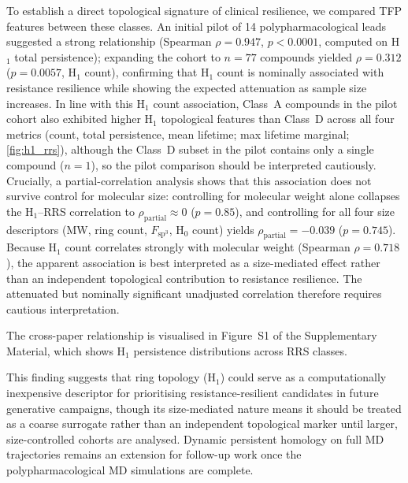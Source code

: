 \documentclass[11pt,a4paper]{article}
\begin{document}
To establish a direct topological signature of clinical resilience, we compared TFP features between these classes. An initial pilot of 14 polypharmacological leads suggested a strong relationship (Spearman $\rho = \num{0.947}$, $p < \num{0.0001}$, computed on H$_1$ total persistence); expanding the cohort to $n = \num{77}$ compounds yielded $\rho = \num{0.312}$ ($p = \num{0.0057}$, H$_1$ count), confirming that H$_1$ count is nominally associated with resistance resilience while showing the expected attenuation as sample size increases. In line with this H$_1$ count association, Class~A compounds in the pilot cohort also exhibited higher H$_1$ topological features than Class~D across all four metrics (count, total persistence, mean lifetime; max lifetime marginal; \cref{fig:h1_rrs}), although the Class~D subset in the pilot contains only a single compound ($n = 1$), so the pilot comparison should be interpreted cautiously. Crucially, a partial-correlation analysis shows that this association does not survive control for molecular size: controlling for molecular weight alone collapses the H$_1$--RRS correlation to $\rho_{\text{partial}} \approx 0$ ($p = \num{0.85}$), and controlling for all four size descriptors (MW, ring count, $F_{\mathrm{sp}^3}$, H$_0$ count) yields $\rho_{\text{partial}} = -\num{0.039}$ ($p = \num{0.745}$). Because H$_1$ count correlates strongly with molecular weight (Spearman $\rho = \num{0.718}$), the apparent association is best interpreted as a size-mediated effect rather than an independent topological contribution to resistance resilience. The attenuated but nominally significant unadjusted correlation therefore requires cautious interpretation.

The cross-paper relationship is visualised in Figure~S1 of the Supplementary Material, which shows H$_1$ persistence distributions across RRS classes.

This finding suggests that ring topology (H$_1$) could serve as a computationally inexpensive descriptor for prioritising resistance-resilient candidates in future generative campaigns, though its size-mediated nature means it should be treated as a coarse surrogate rather than an independent topological marker until larger, size-controlled cohorts are analysed. Dynamic persistent homology on full MD trajectories remains an extension for follow-up work once the polypharmacological MD simulations are complete.

\end{document}
